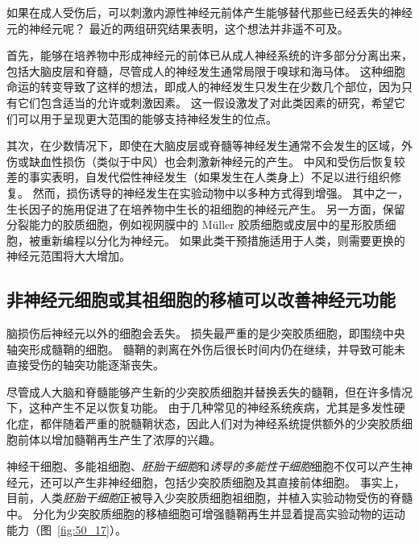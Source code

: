 如果在成人受伤后，可以刺激内源性神经元前体产生能够替代那些已经丢失的神经元的神经元呢？
最近的两组研究结果表明，这个想法并非遥不可及。


首先，能够在培养物中形成神经元的前体已从成人神经系统的许多部分分离出来，包括大脑皮层和脊髓，尽管成人的神经发生通常局限于嗅球和海马体。
这种细胞命运的转变导致了这样的想法，即成人的神经发生只发生在少数几个部位，因为只有它们包含适当的允许或刺激因素。
这一假设激发了对此类因素的研究，希望它们可以用于呈现更大范围的能够支持神经发生的位点。


其次，在少数情况下，即使在大脑皮层或脊髓等神经发生通常不会发生的区域，外伤或缺血性损伤（类似于中风）也会刺激新神经元的产生。
中风和受伤后恢复较差的事实表明，自发代偿性神经发生（如果发生在人类身上）不足以进行组织修复。
然而，损伤诱导的神经发生在实验动物中以多种方式得到增强。
其中之一，生长因子的施用促进了在培养物中生长的祖细胞的神经元产生。
另一方面，保留分裂能力的胶质细胞，例如视网膜中的 Müller 胶质细胞或皮层中的星形胶质细胞，被重新编程以分化为神经元。
如果此类干预措施适用于人类，则需要更换的神经元范围将大大增加。



\subsection{非神经元细胞或其祖细胞的移植可以改善神经元功能}

脑损伤后神经元以外的细胞会丢失。
损失最严重的是少突胶质细胞，即围绕中央轴突形成髓鞘的细胞。
髓鞘的剥离在外伤后很长时间内仍在继续，并导致可能未直接受伤的轴突功能逐渐丧失。


尽管成人大脑和脊髓能够产生新的少突胶质细胞并替换丢失的髓鞘，但在许多情况下，这种产生不足以恢复功能。
由于几种常见的神经系统疾病，尤其是多发性硬化症，都伴随着严重的脱髓鞘状态，因此人们对为神经系统提供额外的少突胶质细胞前体以增加髓鞘再生产生了浓厚的兴趣。


神经干细胞、多能祖细胞、\textit{胚胎干细胞}和\textit{诱导的多能性干细胞}细胞不仅可以产生神经元，还可以产生非神经细胞，包括少突胶质细胞及其直接前体细胞。
事实上，目前，人类\textit{胚胎干细胞}正被导入少突胶质细胞祖细胞，并植入实验动物受伤的脊髓中。
分化为少突胶质细胞的移植细胞可增强髓鞘再生并显着提高实验动物的运动能力（图~\ref{fig:50_17}）。


